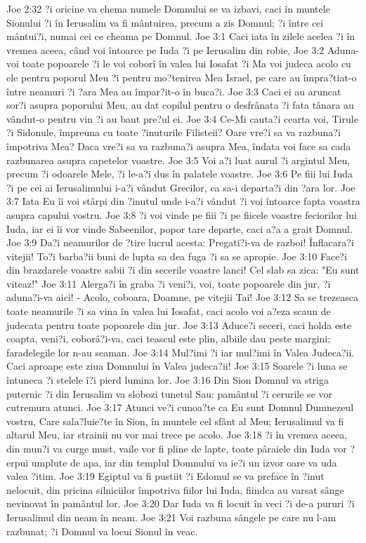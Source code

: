 Joe 2:32  ?i oricine va chema numele Domnului se va izbavi, caci în muntele Sionului ?i în Ierusalim va fi mântuirea, precum a zis Domnul; ?i între cei mântui?i, numai cei ce cheama pe Domnul.
Joe 3:1  Caci iata în zilele acelea ?i în vremea aceea, când voi întoarce pe Iuda ?i pe Ierusalim din robie,
Joe 3:2  Aduna-voi toate popoarele ?i le voi coborî în valea lui Iosafat ?i Ma voi judeca acolo cu ele pentru poporul Meu ?i pentru mo?tenirea Mea Israel, pe care au împra?tiat-o între neamuri ?i ?ara Mea au împar?it-o în buca?i.
Joe 3:3  Caci ei au aruncat sor?i asupra poporului Meu, au dat copilul pentru o desfrânata ?i fata tânara au vândut-o pentru vin ?i au baut pre?ul ei.
Joe 3:4  Ce-Mi cauta?i cearta voi, Tirule ?i Sidonule, împreuna cu toate ?inuturile Filisteii? Oare vre?i sa va razbuna?i împotriva Mea? Daca vre?i sa va razbuna?i asupra Mea, îndata voi face sa cada razbunarea asupra capetelor voastre.
Joe 3:5  Voi a?i luat aurul ?i argintul Meu, precum ?i odoarele Mele, ?i le-a?i dus în palatele voastre.
Joe 3:6  Pe fiii lui Iuda ?i pe cei ai Ierusalimului i-a?i vândut Grecilor, ca sa-i departa?i din ?ara lor.
Joe 3:7  Iata Eu îi voi stârpi din ?inutul unde i-a?i vândut ?i voi întoarce fapta voastra asupra capului vostru.
Joe 3:8  ?i voi vinde pe fiii ?i pe fiicele voastre feciorilor lui Iuda, iar ei îi vor vinde Sabeenilor, popor tare departe, caci a?a a grait Domnul.
Joe 3:9  Da?i neamurilor de ?tire lucrul acesta: Pregati?i-va de razboi! Înflacara?i vitejii! To?i barba?ii buni de lupta sa dea fuga ?i sa se apropie.
Joe 3:10  Face?i din brazdarele voastre sabii ?i din secerile voastre lanci! Cel slab sa zica: "Eu sunt viteaz!"
Joe 3:11  Alerga?i în graba ?i veni?i, voi, toate popoarele din jur, ?i aduna?i-va aici! - Acolo, coboara, Doamne, pe vitejii Tai!
Joe 3:12  Sa se trezeasca toate neamurile ?i sa vina în valea lui Iosafat, caci acolo voi a?eza scaun de judecata pentru toate popoarele din jur.
Joe 3:13  Aduce?i seceri, caci holda este coapta, veni?i, coborâ?i-va, caci teascul este plin, albiile dau peste margini; faradelegile lor n-au seaman.
Joe 3:14  Mul?imi ?i iar mul?imi în Valea Judeca?ii. Caci aproape este ziua Domnului în Valea judeca?ii!
Joe 3:15  Soarele ?i luna se întuneca ?i stelele î?i pierd lumina lor.
Joe 3:16  Din Sion Domnul va striga puternic ?i din Ierusalim va slobozi tunetul Sau: pamântul ?i cerurile se vor cutremura atunci.
Joe 3:17  Atunci ve?i cunoa?te ca Eu sunt Domnul Dumnezeul vostru, Care sala?luie?te în Sion, în muntele cel sfânt al Meu; Ierusalimul va fi altarul Meu, iar strainii nu vor mai trece pe acolo.
Joe 3:18  ?i în vremea aceea, din mun?i va curge must, vaile vor fi pline de lapte, toate pâraiele din Iuda vor ?erpui umplute de apa, iar din templul Domnului va ie?i un izvor oare va uda valea ?itim.
Joe 3:19  Egiptul va fi pustiit ?i Edomul se va preface în ?inut nelocuit, din pricina silniciilor împotriva fiilor lui Iuda, fiindca au varsat sânge nevinovat în pamântul lor.
Joe 3:20  Dar Iuda va fi locuit în veci ?i de-a pururi ?i Ierusalimul din neam în neam.
Joe 3:21  Voi razbuna sângele pe care nu l-am razbunat; ?i Domnul va locui Sionul în veac.


